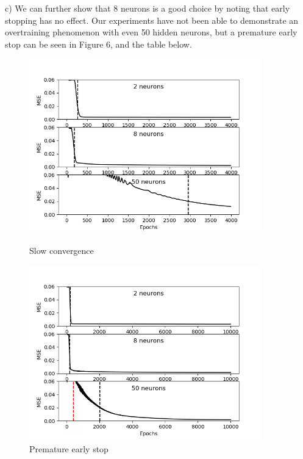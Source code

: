 \documentclass[11pt]{article}
\begin{document}
\begin{enumerate}
c) We can further show that 8 neurons is a good choice by noting that early stopping has no effect. Our experiments have not been able to demonstrate an overtraining phenomenon with even 50 hidden neurons, but a premature early stop can be seen in Figure 6, and the table below.\newline


\begin{figure}[h!]
    \centering
    \begin{minipage}{0.45\textwidth}
        \centering
        \includegraphics[width=0.9\textwidth]{q1c-1-50_neurons_slow_convergence2} %
        \caption{Slow convergence}
    \end{minipage}\hfill
    \begin{minipage}{0.45\textwidth}
        \centering
        \includegraphics[width=0.9\textwidth]{q1c-2-earlyStopping} %
        \caption{Premature early stop}
    \end{minipage}
\end{figure}


\end{enumerate}
\end{document}
